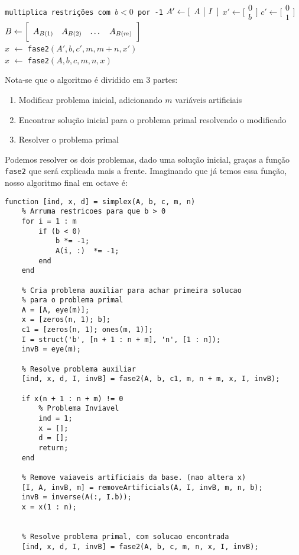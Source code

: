 \documentclass[12pt]{article}
\begin{document}
    \begin{algorithmic}
        \State \texttt{multiplica restrições com $b < 0$ por -1}
        \State $A' \gets [\begin{array}{c | c} A & I \end{array}]$
        \State $x' \gets \bigg [\begin{array}{c} 0 \\ \hline b \end{array} \bigg]$
        \State $c' \gets \bigg [\begin{array}{c} 0 \\ \hline 1 \end{array} \bigg]$
        \State $B \gets \bigg [\begin{array}{c c c c} A_{B(1)} & A_{B(2)} & \dots & A_{B(m)} \end{array} \bigg ]$ \\
        \State $x$ $\gets$ \texttt{fase2}$(A', b, c', m, m + n, x')$ \\
        \State $x$ $\gets$ \texttt{fase2}$(A, b, c, m, n, x)$ 
    \EndFunction
    \end{algorithmic}

    Nota-se que o algoritmo é dividido em 3 partes:
    \begin{enumerate}
        \item Modificar problema inicial, adicionando $m$ variáveis artificiais
        \item Encontrar solução inicial para o problema primal resolvendo o modificado
        \item Resolver o problema primal
    \end{enumerate}
    Podemos resolver os dois problemas, dado uma solução inicial, graças a função \texttt{fase2} que será explicada mais a frente. Imaginando que já temos essa função, nosso algoritmo final em octave é:

    \begin{lstlisting}
function [ind, x, d] = simplex(A, b, c, m, n)
    % Arruma restricoes para que b > 0
    for i = 1 : m
        if (b < 0)
            b *= -1;
            A(i, :)  *= -1;
        end
    end

    % Cria problema auxiliar para achar primeira solucao 
    % para o problema primal
    A = [A, eye(m)];
    x = [zeros(n, 1); b];
    c1 = [zeros(n, 1); ones(m, 1)];
    I = struct('b', [n + 1 : n + m], 'n', [1 : n]);
    invB = eye(m);

    % Resolve problema auxiliar
    [ind, x, d, I, invB] = fase2(A, b, c1, m, n + m, x, I, invB);

    if x(n + 1 : n + m) != 0
        % Problema Inviavel
        ind = 1;
        x = [];
        d = [];
        return;
    end

    % Remove vaiaveis artificiais da base. (nao altera x)
    [I, A, invB, m] = removeArtificials(A, I, invB, m, n, b);
    invB = inverse(A(:, I.b));
    x = x(1 : n);


    % Resolve problema primal, com solucao encontrada
    [ind, x, d, I, invB] = fase2(A, b, c, m, n, x, I, invB);
    \end{lstlisting}
\end{document}
